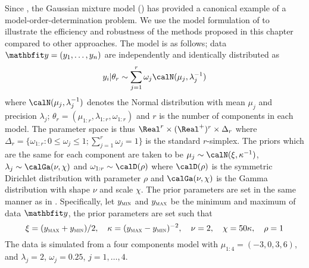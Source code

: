 Since \cite{Richardson:1997ea}, the Gaussian mixture model (\gmm) has
provided a canonical example of a model-order-determination problem. We use
the model formulation of \cite{DelMoral:2006hc} to illustrate the efficiency
and robustness of the methods proposed in this chapter compared to other
approaches. The model is as follows; data $\data = (y_1,\dots,y_n)$ are
independently and identically distributed as
\begin{equation*}
  y_i|\theta_r \sim \sum_{j=1}^r \omega_j\calN(\mu_j,\lambda_j^{-1})
\end{equation*}
where $\calN(\mu_j,\lambda_j^{-1})$ denotes the Normal distribution with mean
$\mu_j$ and precision $\lambda_j$; $\theta_r =
(\mu_{1:r},\lambda_{1:r},\omega_{1:r})$ and $r$ is the number of components in
each model. The parameter space is thus $\Real^r \times (\Real^{+})^r\times
\Delta_r$ where $\Delta_r = \{\omega_{1:r}:0\le\omega_j\le1;
\sum_{j=1}^r\omega_j=1\}$ is the standard $r$-simplex. The priors which are
the same for each component are taken to be $\mu_j\sim\calN(\xi,\kappa^{-1})$,
$\lambda_j\sim\calGa(\nu,\chi)$ and $\omega_{1:r}\sim\calD(\rho)$ where
$\calD(\rho)$ is the symmetric Dirichlet distribution with parameter $\rho$
and $\calGa(\nu,\chi)$ is the Gamma distribution with shape $\nu$ and scale
$\chi$. The prior parameters are set in the same manner as in
\cite{Richardson:1997ea}. Specifically, let $y_{\text{\textsc{min}}}$ and
$y_{\text{\textsc{max}}}$ be the minimum and maximum of data $\data$, the
prior parameters are set such that
\begin{equation*}
  \xi = (y_{\text{\textsc{max}}} + y_{\text{\textsc{min}}}) / 2, \quad
  \kappa = (y_{\text{\textsc{max}}} - y_{\text{\textsc{min}}})^{-2}, \quad
  \nu = 2, \quad \chi = 50\kappa, \quad \rho = 1
\end{equation*}
The data is simulated from a four components model with $\mu_{1:4} = (-3, 0,3,
6)$, and $\lambda_j =2$, $\omega_j = 0.25$, $j = 1,\dots,4$.

